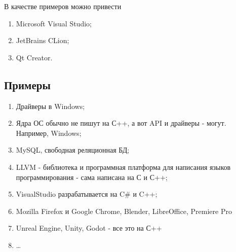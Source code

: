 В качестве примеров можно привести
\begin{enumerate}
  \item Microsoft Visual Studio;
  \item JetBrains CLion;
  \item Qt Creator.
\end{enumerate}

\subsection*{Примеры}\label{examples_3}

\begin{enumerate}
\item
  Драйверы в Windows;
\item
  Ядра ОС обычно не пишут на С++, а вот API и драйверы - могут.
  Например, Windows;
\item
  MySQL, свободная реляционная БД;
\item
  LLVM - библиотека и программная платформа для написания языков
  программирования - сама написана на С и С++;
\item
  VisualStudio разрабатывается на C\# и C++;
\item
  Mozilla Firefox и Google Chrome, Blender, LibreOffice, Premiere Pro
\item
  Unreal Engine, Unity, Godot - все это на С++
\item
  \ldots{}
\end{enumerate}
